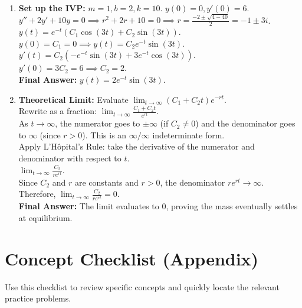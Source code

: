 \documentclass[11pt]{article}
\begin{document}
\begin{enumerate}[label=\textbf{\arabic*.}]
    \item \textbf{Set up the IVP:} $m=1, b=2, k=10$. $y(0) = 0, y'(0) = 6$. \\
    $y'' + 2y' + 10y = 0 \implies r^2 + 2r + 10 = 0 \implies r = \frac{-2 \pm \sqrt{4 - 40}}{2} = -1 \pm 3i$. \\
    $y(t) = e^{-t}(C_1 \cos(3t) + C_2 \sin(3t))$. \\
    $y(0) = C_1 = 0 \implies y(t) = C_2 e^{-t}\sin(3t)$. \\
    $y'(t) = C_2(-e^{-t}\sin(3t) + 3e^{-t}\cos(3t))$. \\
    $y'(0) = 3C_2 = 6 \implies C_2 = 2$. \\
    \textbf{Final Answer:} $y(t) = 2e^{-t}\sin(3t)$.

    \item \textbf{Theoretical Limit:} Evaluate $\lim_{t \to \infty} (C_1 + C_2 t)e^{-rt}$. \\
    Rewrite as a fraction: $\lim_{t \to \infty} \frac{C_1 + C_2 t}{e^{rt}}$. \\
    As $t \to \infty$, the numerator goes to $\pm \infty$ (if $C_2 \neq 0$) and the denominator goes to $\infty$ (since $r > 0$). This is an $\infty/\infty$ indeterminate form. \\
    Apply L'Hôpital's Rule: take the derivative of the numerator and denominator with respect to $t$. \\
    $\lim_{t \to \infty} \frac{C_2}{r e^{rt}}$. \\
    Since $C_2$ and $r$ are constants and $r > 0$, the denominator $re^{rt} \to \infty$. \\
    Therefore, $\lim_{t \to \infty} \frac{C_2}{r e^{rt}} = 0$. \\
    \textbf{Final Answer:} The limit evaluates to 0, proving the mass eventually settles at equilibrium.

\end{enumerate}

\newpage

\section{Concept Checklist (Appendix)}
Use this checklist to review specific concepts and quickly locate the relevant practice problems.
\end{document}
